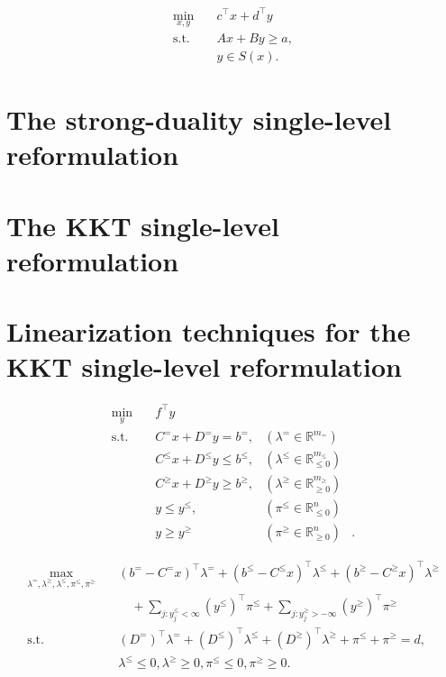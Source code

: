 
\begin{subequations}
    \begin{align}
        \min_{x,y} \quad & c^\top x + d^\top y \\
        \text{s.t.} \quad & Ax + By \ge a, \\
        & y\in S(x).
    \end{align}
\end{subequations}

\section{The strong-duality single-level reformulation}

\section{The KKT single-level reformulation}

\section{Linearization techniques for the KKT single-level reformulation}

\begin{subequations}
    \begin{align}
        \min_y \quad & f^\top y \\
        \text{s.t.} \quad & C^=x + D^=y = b^=, & (\lambda^=\in\mathbb{R}^{m_=}) \\
        & C^\le x + D^\le y \le b^\le, & (\lambda^\le\in\mathbb{R}^{m_\le}_{\le 0}) \\
        & C^\ge x + D^\ge y \ge b^\ge, & (\lambda^\ge\in\mathbb{R}^{m_\ge}_{\ge 0}) \\
        & y \le y^\le, & (\pi^\le\in\mathbb{R}^{n}_{\le 0}) \\
        & y \ge y^\ge & (\pi^\ge\in\mathbb{R}^{n}_{\ge 0})&.
    \end{align}
\end{subequations}

\begin{subequations}
    \begin{align}
        \max_{ \lambda^=, \lambda^\ge, \lambda^\le, \pi^\le, \pi^\ge } \quad & 
        (b^= - C^=x)^\top\lambda^=
        + (b^\le - C^\le x)^\top\lambda^\le
        + (b^\ge - C^\ge x)^\top\lambda^\ge \\
        & \quad 
        +\sum_{j:y^\le_j < \infty} (y^\le)^\top\pi^\le
        +\sum_{j:y^\ge_j > -\infty} (y^\ge)^\top\pi^\ge \\
        \text{s.t.} \quad & (D^=)^\top\lambda^= + (D^\le)^\top\lambda^\le + (D^\ge)^\top\lambda^\ge + \pi^\le + \pi^\ge = d, \\
        & \lambda^\le \le 0, \lambda^\ge \ge 0, \pi^\le \le 0, \pi^\ge \ge 0.
    \end{align}
\end{subequations}

